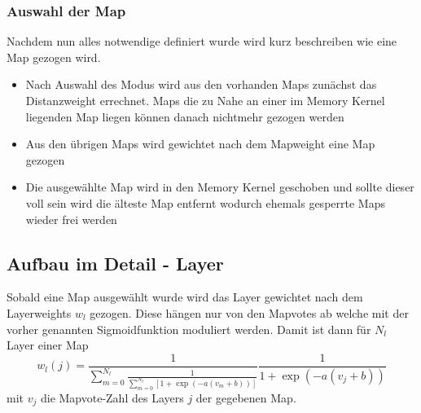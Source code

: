         \subsubsection{Auswahl der Map}
            Nachdem nun alles notwendige definiert wurde wird kurz beschreiben wie eine Map gezogen wird.
            \begin{itemize}
                \item Nach Auswahl des Modus wird aus den vorhanden Maps zunächst das Distanzweight errechnet. Maps die zu Nahe an einer im Memory Kernel liegenden Map liegen können danach nichtmehr gezogen werden 
                \item Aus den übrigen Maps wird gewichtet nach dem Mapweight eine Map gezogen 
                \item Die ausgewählte Map wird in den Memory Kernel geschoben und sollte dieser voll sein wird die älteste Map entfernt wodurch ehemals gesperrte Maps wieder frei werden
            \end{itemize}
    \subsection{Aufbau im Detail - Layer}
    Sobald eine Map ausgewählt wurde wird das Layer gewichtet nach dem Layerweights $w_l$ gezogen. 
    Diese hängen nur von den Mapvotes ab welche mit der vorher genannten Sigmoidfunktion moduliert werden.
    Damit ist dann für $N_l$ Layer einer Map 
    \begin{equation}
        w_l(j) = \frac{1}{\sum_{m=0}^{N_l}\frac{1}{\sum_{m=0}^{N_l}\left[1+\exp\left(-a(v_m+b)\right)\right]}}\frac{1}{1+\exp\left(-a(v_j+b)\right)}
    \end{equation} 
    mit $v_j$ die Mapvote-Zahl des Layers $j$ der gegebenen Map.
